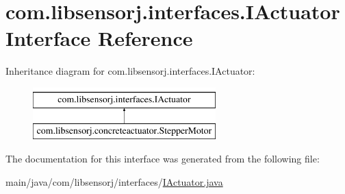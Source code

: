 \hypertarget{interfacecom_1_1libsensorj_1_1interfaces_1_1IActuator}{}\section{com.\+libsensorj.\+interfaces.\+I\+Actuator Interface Reference}
\label{interfacecom_1_1libsensorj_1_1interfaces_1_1IActuator}
Inheritance diagram for com.\+libsensorj.\+interfaces.\+I\+Actuator\+:\begin{figure}[H]
\begin{center}
\leavevmode
\includegraphics[height=2.000000cm]{interfacecom_1_1libsensorj_1_1interfaces_1_1IActuator}
\end{center}
\end{figure}


The documentation for this interface was generated from the following file\+:\begin{DoxyCompactItemize}
\item 
main/java/com/libsensorj/interfaces/\hyperlink{IActuator_8java}{I\+Actuator.\+java}\end{DoxyCompactItemize}
